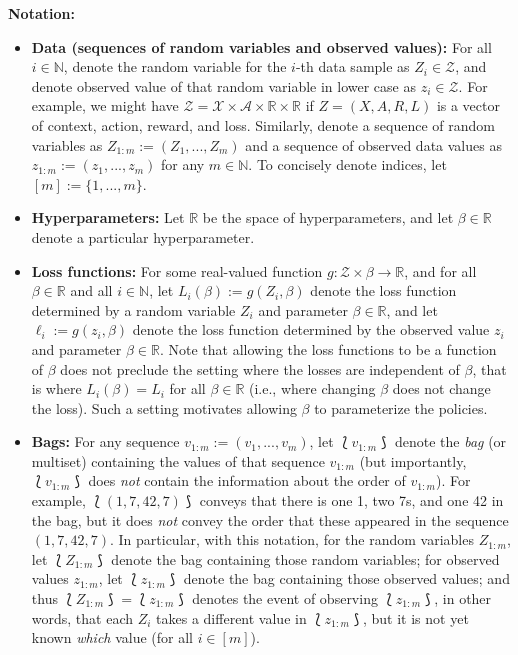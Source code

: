 \textbf{Notation:}
\begin{itemize}
    \item \textbf{Data (sequences of random variables and observed values):} For all $i\in \mathbb{N}$, denote the random variable for the $i$-th data sample as $Z_i\in \mathcal{Z}$, and denote observed value of that random variable in lower case as $z_i\in\mathcal{Z}$. For example, we might have $\mathcal{Z}=\mathcal{X}\times \mathcal{A}\times \mathbb{R}\times \mathbb{R}$ if $Z=(X, A, R, L)$ is a vector of context, action, reward, and loss. Similarly, denote a sequence of random variables as $Z_{1:m}:=(Z_1, ..., Z_m)$ and a sequence of observed data values as $z_{1:m}:=(z_1, ..., z_m)$ for any $m \in \mathbb{N}$. To concisely denote indices, let $[m]:=\{1, ..., m\}$.
    \item \textbf{Hyperparameters:} Let $\mathbb{R}$ be the space of hyperparameters, and let $\beta\in \mathbb{R}$ denote a particular hyperparameter. 
    \item \textbf{Loss functions:} For some real-valued function $g :\mathcal{Z}\times \beta \rightarrow \mathbb{R}$, and for all $\beta\in\mathbb{R}$ and all $i\in \mathbb{N}$, let $L_i(\beta):= g(Z_i,\beta)$ denote the loss function determined by a random variable $Z_i$ and parameter $\beta\in \mathbb{R}$, and let $\ell_i:= g(z_i,\beta)$ denote the loss function determined by the observed value $z_i$ and parameter $\beta\in \mathbb{R}$. Note that allowing the loss functions to be a function of $\beta$ does not preclude the setting where the losses are independent of $\beta$, that is where $L_i(\beta)=L_i$ for all $\beta\in\mathbb{R}$ (i.e., where changing $\beta$ does not change the loss). Such a setting motivates allowing $\beta$ to parameterize the policies.
    \item \textbf{Bags:} For any sequence $v_{1:m}:=(v_1, ..., v_m)$, let $\lbag v_{1:m} \rbag$ denote the \textit{bag} (or multiset) containing the values of that sequence $v_{1:m}$ (but importantly, $\lbag v_{1:m} \rbag$ does \textit{not} contain the information about the order of $v_{1:m}$). For example, $\lbag (1, 7, 42, 7) \rbag$ conveys that there is one 1, two 7s, and one 42 in the bag, but it does \textit{not} convey the order that these appeared in the sequence $(1, 7, 42, 7)$. In particular, with this notation, for the random variables $Z_{1:m}$, let $\lbag Z_{1:m} \rbag$ denote the bag containing those random variables; for observed values $z_{1:m}$, let $\lbag z_{1:m} \rbag$ denote the bag containing those observed values; and thus $\lbag Z_{1:m} \rbag = \lbag z_{1:m} \rbag$ denotes the event of observing $\lbag z_{1:m} \rbag$, in other words, that each $Z_i$ takes a different value in $\lbag z_{1:m} \rbag$, but it is not yet known \textit{which} value (for all $i\in [m]$).

\end{itemize}
